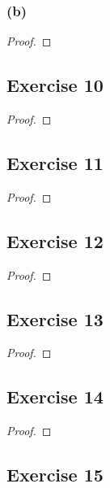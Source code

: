 \documentclass[14pt]{extarticle}
\begin{document}
\subsubsection{(b)}

\begin{proof}

\end{proof}

\subsection{Exercise 10}

\begin{proof}

\end{proof}

\subsection{Exercise 11}

\begin{proof}

\end{proof}

\subsection{Exercise 12}

\begin{proof}

\end{proof}

\subsection{Exercise 13}

\begin{proof}

\end{proof}

\subsection{Exercise 14}

\begin{proof}

\end{proof}

\subsection{Exercise 15}
\end{document}
